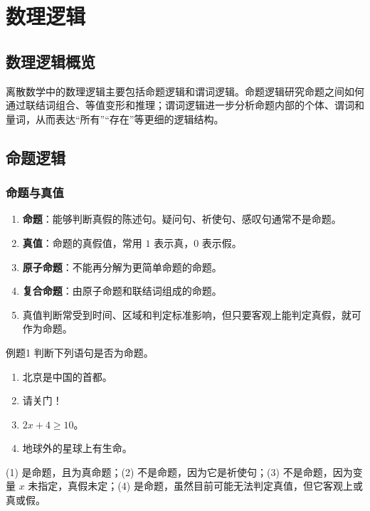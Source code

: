 \section{数理逻辑}

\subsection{数理逻辑概览}

离散数学中的数理逻辑主要包括命题逻辑和谓词逻辑。命题逻辑研究命题之间如何通过联结词组合、等值变形和推理；谓词逻辑进一步分析命题内部的个体、谓词和量词，从而表达“所有”“存在”等更细的逻辑结构。

\subsection{命题逻辑}

\subsubsection{命题与真值}

\begin{enumerate}
	\item \textbf{命题}：能够判断真假的陈述句。疑问句、祈使句、感叹句通常不是命题。
	\item \textbf{真值}：命题的真假值，常用 \(1\) 表示真，\(0\) 表示假。
	\item \textbf{原子命题}：不能再分解为更简单命题的命题。
	\item \textbf{复合命题}：由原子命题和联结词组成的命题。
	\item 真值判断常受到时间、区域和判定标准影响，但只要客观上能判定真假，就可作为命题。
\end{enumerate}

\begin{question}{例题1}
	判断下列语句是否为命题。
	\begin{enumerate}
		\item 北京是中国的首都。
		\item 请关门！
		\item \(2x+4\ge 10\)。
		\item 地球外的星球上有生命。
	\end{enumerate}
	
	\begin{solution}
	(1) 是命题，且为真命题；(2) 不是命题，因为它是祈使句；(3) 不是命题，因为变量 \(x\) 未指定，真假未定；(4) 是命题，虽然目前可能无法判定真值，但它客观上或真或假。
	\end{solution}
\end{question}

